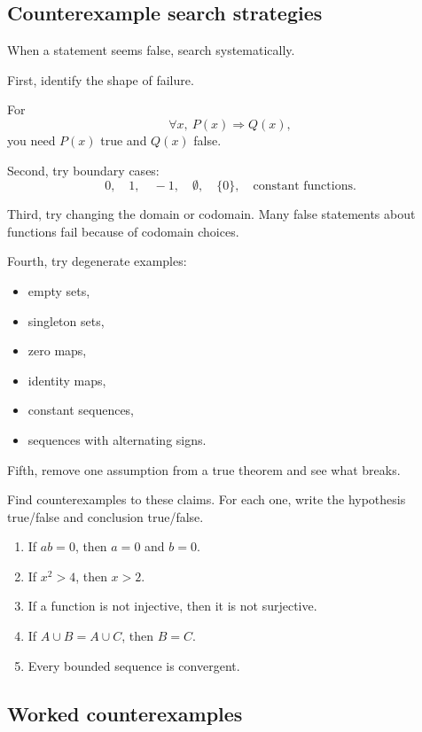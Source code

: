 \subsection{Counterexample search strategies}

When a statement seems false, search systematically.

First, identify the shape of failure.

For
\[
\forall x,\ P(x)\Rightarrow Q(x),
\]
you need $P(x)$ true and $Q(x)$ false.

Second, try boundary cases:
\[
0,\quad1,\quad -1,\quad \emptyset,\quad \{0\},\quad \text{constant functions}.
\]

Third, try changing the domain or codomain. Many false statements about functions fail because of codomain choices.

Fourth, try degenerate examples:

\begin{itemize}
\item empty sets,
\item singleton sets,
\item zero maps,
\item identity maps,
\item constant sequences,
\item sequences with alternating signs.
\end{itemize}

Fifth, remove one assumption from a true theorem and see what breaks.

\begin{labbox}
Find counterexamples to these claims. For each one, write the hypothesis true/false and conclusion true/false.

\begin{enumerate}
\item If $ab=0$, then $a=0$ and $b=0$.
\item If $x^2>4$, then $x>2$.
\item If a function is not injective, then it is not surjective.
\item If $A\cup B=A\cup C$, then $B=C$.
\item Every bounded sequence is convergent.
\end{enumerate}
\end{labbox}

\subsection{Worked counterexamples}

